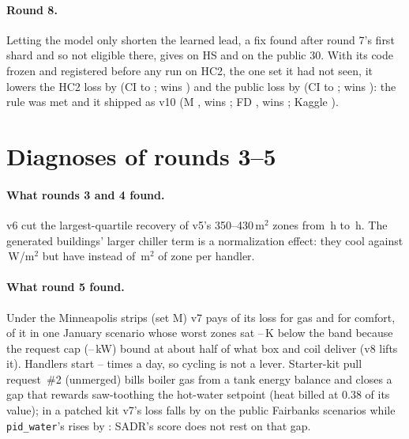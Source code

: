 \documentclass{article}
\begin{document}
\paragraph{Round 8.}
Letting the model only shorten the learned lead, a fix found after round 7's first shard and so not eligible there,
gives \RSevLedgerHsRel{} on HS and \RSevLedgerPubRel{} on the public 30. With its code frozen and registered before any
run on HC2, the one set it had not seen, it lowers the HC2 loss by \REigConfHarshCTwoRelAbs{} (CI
\REigConfHarshCTwoRelHiAbs{} to \REigConfHarshCTwoRelLoAbs; wins \REigConfHarshCTwoWins) and the public loss by
\REigConfPubRelAbs{} (CI \REigConfPubRelHiAbs{} to \REigConfPubRelLoAbs; wins \REigConfPubWins): the rule was met
and it shipped as v10 (M \REigConfMinnRel, wins \REigConfMinnWins; FD \REigConfFreshDefRel, wins
\REigConfFreshDefWins; Kaggle \REigKagVTen).

\section{Diagnoses of rounds 3--5}
\label{app:diag}
\paragraph{What rounds 3 and 4 found.}
v6 cut the largest-quartile recovery of v5's 350--430\,m$^2$ zones from \DecHeldRVFiveRecoveryBig\,h to
\DecHeldROursRecoveryBig\,h. The generated buildings' larger chiller term is a normalization effect: they cool
\RFCoolWmRThree{} against \RFCoolWmPub\,W/m$^2$ but have \RFAreaPerAhuRThree{} instead of \RFAreaPerAhuPub\,m$^2$ of zone per handler.

\paragraph{What round 5 found.}
Under the Minneapolis strips (set M) v7 pays \RFiveDecMinnGasShare{} of its loss for gas and
\RFiveDecMinnComfortShare{} for comfort, \RFiveCapComfortShareOfMinn{} of it in one January scenario whose
\RFiveCapNZones{} worst zones sat \RFiveCapDefMin--\RFiveCapDefMax\,K below the band because the request cap
(\RFiveCapReqKwMin--\RFiveCapReqKwMax\,kW) bound at about half of what box and coil deliver (v8 lifts it). Handlers
start \RFiveAhuStartsMin--\RFiveAhuStartsMax{} times a day, so cycling is not a lever. Starter-kit pull request~\#2
(unmerged) bills boiler gas from a tank energy balance and closes a gap that rewards saw-toothing the hot-water
setpoint (heat billed at 0.38 of its value); in a patched kit v7's loss falls by \RFivePrTwoVSevenRelAbs{} on the
\RFivePrTwoVSevenN{} public Fairbanks scenarios while \texttt{pid\_water}'s rises by \RFivePrTwoPidRelAbs: SADR's score
does not rest on that gap.
\end{document}

